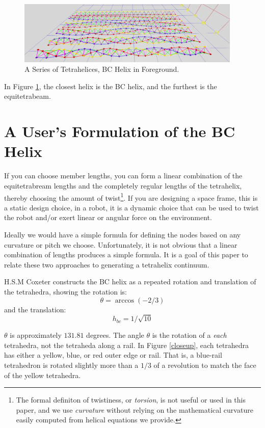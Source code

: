\documentclass[11pt]{article}
\begin{document}
\begin{figure}[H] %
  \label{fig:series}
  \centering
     \includegraphics[width=0.95\textwidth]{figures/TetrahelixSeries.png}
     \caption{A Series of Tetrahelices, BC Helix in Foreground.}
\end{figure}

In Figure
\ref{fig:series}, the closest helix is the BC helix, and the furthest
is the equitetrabeam.

\section{A User's Formulation of the BC Helix}

If you can choose member lengths, you can form a linear combination of
the equitetrabream lengths and the completely regular lengths of the
tetrahelix, thereby choosing the amount of twist\footnote{The formal definiton
  of twistiness, or \emph{torsion}, is not useful or used in this paper, and
  we use \emph{curvature} without relying on the mathematical curvature easily
  computed from helical equations we provide.}.
If you are designing a
space frame, this is a static design choice, in a robot, it is a
dynamic choice that can be used to twist the robot and/or exert linear or
angular force on the environment.

Ideally we would have a simple formula for defining the nodes based on
any curvature or pitch we choose.  Unfortunately, it is not obvious that a linear
combination of lengths produces a simple formula.  It is a goal of
this paper to relate these two approaches to generating a tetrahelix
continuum.

H.S.M Coxeter constructs the BC helix\cite{coxeter1985simplicial} as a repeated rotation and translation of the tetrahedra, showing the
rotation is:
\[
\theta = \arccos(-2/3) 
\]
and the translation:
\[
h_{bc} = 1/\sqrt{10}
\]

$\theta$ is approximately $131.81$ degrees.
The angle $\theta$ is the rotation of a \emph{each} tetrahedra, not the tetraheda along a rail.  In Figure \ref{closeup},
each tetrahedra has either a yellow, blue, or red outer edge or rail.
That is, a blue-rail tetrahedron is rotated slightly more than a $1/3$ of a revolution to match the face of the yellow tetrahedra.
\end{document}
